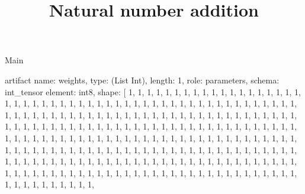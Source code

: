 \begin{lexlean}{Main}
\title{Natural number addition}
\begin{semanticmodule}
artifact{
  name: weights,
  type: (List Int),
  length: 1,
  role: parameters,
  schema: int_tensor{
    element: int8,
    shape: [
      1,
      1,
      1,
      1,
      1,
      1,
      1,
      1,
      1,
      1,
      1,
      1,
      1,
      1,
      1,
      1,
      1,
      1,
      1,
      1,
      1,
      1,
      1,
      1,
      1,
      1,
      1,
      1,
      1,
      1,
      1,
      1,
      1,
      1,
      1,
      1,
      1,
      1,
      1,
      1,
      1,
      1,
      1,
      1,
      1,
      1,
      1,
      1,
      1,
      1,
      1,
      1,
      1,
      1,
      1,
      1,
      1,
      1,
      1,
      1,
      1,
      1,
      1,
      1,
      1,
      1,
      1,
      1,
      1,
      1,
      1,
      1,
      1,
      1,
      1,
      1,
      1,
      1,
      1,
      1,
      1,
      1,
      1,
      1,
      1,
      1,
      1,
      1,
      1,
      1,
      1,
      1,
      1,
      1,
      1,
      1,
      1,
      1,
      1,
      1,
      1,
      1,
      1,
      1,
      1,
      1,
      1,
      1,
      1,
      1,
      1,
      1,
      1,
      1,
      1,
      1,
      1,
      1,
      1,
      1,
      1,
      1,
      1,
      1,
      1,
      1,
      1,
      1,
      1,
      1,
      1,
      1,
      1,
      1,
      1,
      1,
      1,
      1,
      1,
      1,
      1,
      1,
      1,
      1,
      1,
      1,
      1,
      1,
      1,
      1,
      1,
      1,
      1,
      1,
      1,
      1,
      1,
      1,
      1,
      1,
      1,
      1,
      1,
      1,
      1,
      1,
      1,
      1,
      1,
      1,
      1,
      1,
      1,
      1,
      1,
      1,
      1,
      1,
      1,
      1,
      1,
      1,
      1,
      1,
      1,
      1,
      1,
      1,
      1,
      1,
      1,
      1,
      1,
      1,
      1,
      1,
      1,
      1,
      1,
      1,
      1,
      1,
      1,
      1,
      1,
      1,
      1,
      1,
      1,
      1,
      1,
      1,
      1,
      1,
      1,
      1,
      1,
      1,
      1,
      1,
      1,
      1,
      1,
      1,
      1,
      1,
      1,
      1,
      1,
      1,
      1,
      1,
      1,
      1,
      1,
      1,
      1,
      1,
      1,
      1,
      1,
      1,
      1,
      1,
      1,
      1,
      1,
      1,
      1,
      1,
      1,
      1,
      1,
}}
\end{semanticmodule}
\end{lexlean}
